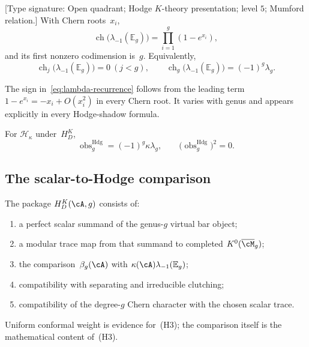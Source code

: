 \begin{corollary}
\label{cor:mumford-multiplicative}
\textup{[Type signature: Open quadrant; Hodge $K$-theory
presentation; level $5$; Mumford relation.]}
With Chern roots~$x_i$,
\begin{equation}
 \operatorname{ch}\bigl(\lambda_{-1}(\mathbb E_g)\bigr)
 =\prod_{i=1}^g(1-e^{x_i}),
 \label{eq:mumford-degree-k}
\end{equation}
and its first nonzero codimension is~$g$.  Equivalently,
\begin{equation}
 \operatorname{ch}_j\bigl(\lambda_{-1}(\mathbb E_g)\bigr)=0
 \ (j<g),
 \qquad
 \operatorname{ch}_g\bigl(\lambda_{-1}(\mathbb E_g)\bigr)
 =(-1)^g\lambda_g.
 \label{eq:lambda-recurrence}
\end{equation}
\end{corollary}

\begin{remark}
\label{rem:chern-character-mumford}
The sign in~\eqref{eq:lambda-recurrence} follows from the leading term
$1-e^{x_i}=-x_i+O(x_i^2)$ in every Chern root.  It varies with genus
and appears explicitly in every Hodge-shadow formula.
\end{remark}

\begin{example}
\label{ex:heisenberg-obs-squares}
For $\mathcal H_\kappa$ under~$H_D^K$,
\[
 \operatorname{obs}^{\mathrm{Hdg}}_g
 =(-1)^g\kappa\lambda_g,
 \qquad
 \bigl(\operatorname{obs}^{\mathrm{Hdg}}_g\bigr)^2=0.
\]
\end{example}

\subsection{The scalar-to-Hodge comparison}

\begin{definition}
\label{def:scalar-diagonal-hypothesis}
The package $H_D^K(\cA,g)$ consists of:
\begin{enumerate}[label=\textup{(H\arabic*)}]
\item a perfect scalar summand of the genus-$g$ virtual bar object;
\item a modular trace map from that summand to completed
$K^0(\overline{\cM}_g)$;
\item the comparison~$\beta_g(\cA)$ with
$\kappa(\cA)\lambda_{-1}(\mathbb E_g)$;
\item compatibility with separating and irreducible clutching;
\item compatibility of the degree-$g$ Chern character with the
chosen scalar trace.
\end{enumerate}
Uniform conformal weight is evidence for~(H3); the comparison itself
is the mathematical content of~(H3).
\end{definition}

